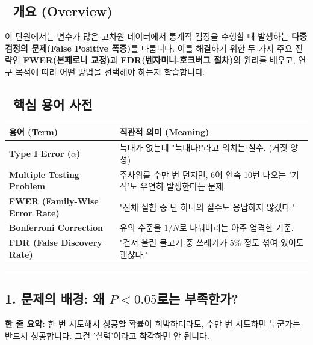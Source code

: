 \documentclass[11pt,a4paper]{book}
\theoremstyle{definition}
\begin{document}
\subsection*{📌 개요 (Overview)}
이 단원에서는 변수가 많은 고차원 데이터에서 통계적 검정을 수행할 때 발생하는 \textbf{다중 검정의 문제(False Positive 폭증)}를 다룹니다. 이를 해결하기 위한 두 가지 주요 전략인 \textbf{FWER(본페로니 교정)}과 \textbf{FDR(벤자미니-호크버그 절차)}의 원리를 배우고, 연구 목적에 따라 어떤 방법을 선택해야 하는지 학습합니다.

\subsection*{📝 핵심 용어 사전}
\begin{table}[h]
\centering
\begin{tabularx}{\textwidth}{|p{}|X|}
\hline
\textbf{용어 (Term)} & \textbf{직관적 의미 (Meaning)} \\
\hline
\textbf{Type I Error ($\alpha$)} & 늑대가 없는데 "늑대다!"라고 외치는 실수. (거짓 양성) \\
\hline
\textbf{Multiple Testing Problem} & 주사위를 수만 번 던지면, 6이 연속 10번 나오는 '기적'도 우연히 발생한다는 문제. \\
\hline
\textbf{FWER (Family-Wise Error Rate)} & "전체 실험 중 단 하나의 실수도 용납하지 않겠다." \\
\hline
\textbf{Bonferroni Correction} & 유의 수준을 $1/N$로 나눠버리는 아주 엄격한 기준. \\
\hline
\textbf{FDR (False Discovery Rate)} & "건져 올린 물고기 중 쓰레기가 5\% 정도 섞여 있어도 괜찮다." \\
\hline
\end{tabularx}
\end{table}

\vspace{0.5cm}\hrule\vspace{0.5cm}

\subsection{1. 문제의 배경: 왜 $P < 0.05$로는 부족한가?}

\begin{conceptbox}[title={개념 1: 로또 당첨의 함정}]
\textbf{한 줄 요약:} 한 번 시도해서 성공할 확률이 희박하더라도, 수만 번 시도하면 누군가는 반드시 성공합니다. 그걸 '실력'이라고 착각하면 안 됩니다.
\end{conceptbox}
\end{document}
